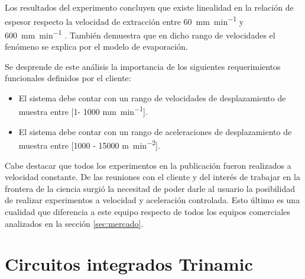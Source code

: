 

Los resultados del experimento concluyen que existe linealidad  en la relación de espesor respecto la velocidad de extracción entre \SI{60}{\milli\meter\per\minute} y \SI{600}{\milli\meter\per\minute} . También demuestra que en dicho rango de velocidades el fenómeno se explica por el modelo de evaporación.

Se desprende de este análisis la importancia de los siguientes requerimientos funcionales definidos por el cliente: 

\begin{itemize}
\item El sistema debe contar con un rango de velocidades de desplazamiento de muestra entre [1- 1000 \si{\milli\meter\per\minute}]. 
\item El sistema debe contar con un rango de aceleraciones de desplazamiento de muestra entre [1000 - 15000 \si{\meter\per\square\minute}].
		
\end{itemize}
	
Cabe destacar que todos los experimentos en la publicación fueron realizados a velocidad constante. De las reuniones con el cliente y del interés de trabajar en la frontera de la ciencia surgió la necesitad de poder darle al usuario la posibilidad de realizar experimentos a velocidad y aceleración controlada. Esto último es una cualidad que diferencia a este equipo respecto de todos los equipos comerciales analizados en la sección \ref{sec:mercado}.

 


\section{Circuitos integrados Trinamic}
\label{sec:Circuitos integrados Trinamic}

